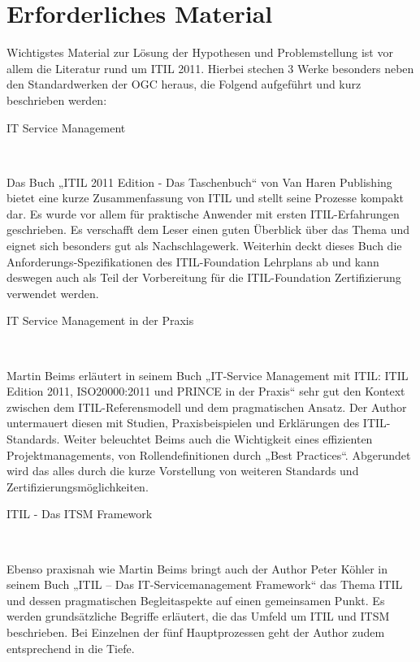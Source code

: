 \section{Erforderliches Material}
\label{ch:ITStateOfArt:sec:ErforderlichesMaterial}

Wichtigstes Material zur Lösung der Hypothesen und Problemstellung ist vor allem die Literatur rund um ITIL 2011. Hierbei stechen 3 Werke besonders neben den Standardwerken der OGC heraus, die Folgend aufgeführt und kurz beschrieben werden:\\
\begin{description}
\item[IT Service Management]~\par
\end{description}
Das Buch „ITIL 2011 Edition - Das Taschenbuch“ \cite{ITGovITIL} von Van Haren Publishing bietet eine kurze Zusammenfassung von ITIL und stellt seine Prozesse kompakt dar. Es wurde vor allem für praktische Anwender mit ersten ITIL-Erfahrungen geschrieben. Es verschafft dem Leser einen guten Überblick über das Thema und eignet sich besonders gut als Nachschlagewerk. Weiterhin deckt dieses Buch die Anforderungs-Spezifikationen des ITIL-Foundation Lehrplans ab und kann deswegen auch als Teil der Vorbereitung für die ITIL-Foundation Zertifizierung verwendet werden.\\
\begin{description}
\item[IT Service Management in der Praxis]~\par
\end{description}Martin Beims erläutert in seinem Buch „IT-Service Management mit ITIL: ITIL Edition 2011, ISO20000:2011 und PRINCE in der Praxis“ \cite{BeimsITManage} sehr gut den Kontext zwischen dem ITIL-Referensmodell und dem pragmatischen Ansatz. Der Author untermauert diesen mit Studien, Praxisbeispielen und Erklärungen des ITIL-Standards. Weiter beleuchtet Beims auch die Wichtigkeit eines effizienten Projektmanagements, von Rollendefinitionen durch „Best Practices“. Abgerundet wird das alles durch die kurze Vorstellung von weiteren Standards und Zertifizierungsmöglichkeiten.\\
\begin{description}
\item[ITIL - Das ITSM Framework]~\par
\end{description}
Ebenso praxisnah wie Martin Beims bringt auch der Author Peter Köhler in seinem Buch „ITIL – Das IT-Servicemanagement Framework“ \cite{KoehlerITSM} das Thema ITIL und dessen pragmatischen Begleitaspekte auf einen gemeinsamen Punkt. Es werden grundsätzliche Begriffe erläutert, die das Umfeld um ITIL und ITSM beschrieben. Bei Einzelnen der fünf Hauptprozessen geht der Author zudem entsprechend in die Tiefe.

